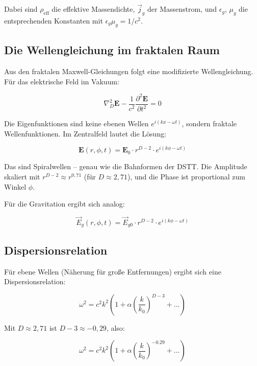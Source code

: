 \documentclass[12pt,a4paper]{article}
\begin{document}
Dabei sind $\rho_{\text{eff}}$ die effektive Massendichte, $\vec{j}_g$ der Massenstrom, und $\epsilon_g$, $\mu_g$ die entsprechenden Konstanten mit $\epsilon_g\mu_g = 1/c^2$.

\subsection{Die Wellengleichung im fraktalen Raum}

Aus den fraktalen Maxwell-Gleichungen folgt eine modifizierte Wellengleichung. Für das elektrische Feld im Vakuum:

\begin{equation}
\nabla_D^2 \mathbf{E} - \frac{1}{c^2} \frac{\partial^2 \mathbf{E}}{\partial t^2} = 0
\end{equation}

Die Eigenfunktionen sind keine ebenen Wellen $e^{i(kx-\omega t)}$, sondern fraktale Wellenfunktionen. Im Zentralfeld lautet die Lösung:

\begin{equation}
\mathbf{E}(r, \phi, t) = \mathbf{E}_0 \cdot r^{D-2} \cdot e^{i(k\phi - \omega t)}
\end{equation}

Das sind Spiralwellen -- genau wie die Bahnformen der DSTT. Die Amplitude skaliert mit $r^{D-2} \approx r^{0,71}$ (für $D \approx 2,71$), und die Phase ist proportional zum Winkel $\phi$.

Für die Gravitation ergibt sich analog:

\begin{equation}
\vec{E}_g(r, \phi, t) = \vec{E}_{g0} \cdot r^{D-2} \cdot e^{i(k\phi - \omega t)}
\end{equation}

\subsection{Dispersionsrelation}
\label{sec:dispersion}

Für ebene Wellen (Näherung für große Entfernungen) ergibt sich eine Dispersionsrelation:

\begin{equation}
\omega^2 = c^2 k^2 \left( 1 + \alpha \left( \frac{k}{k_0} \right)^{D-3} + \ldots \right)
\end{equation}

Mit $D \approx 2,71$ ist $D-3 \approx -0,29$, also:

\begin{equation}
\omega^2 = c^2 k^2 \left( 1 + \alpha \left( \frac{k}{k_0} \right)^{-0.29} + \ldots \right)
\end{equation}
\end{document}
